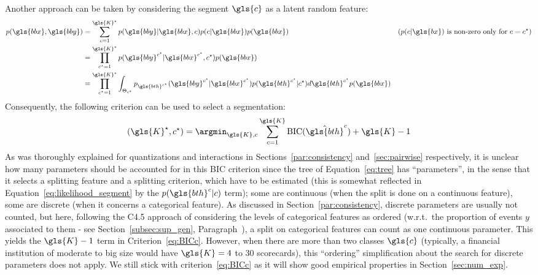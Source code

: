 Another approach can be taken by considering the segment $\gls{c}$ as a latent random feature:
\begin{align}
p(\gls{bbx},\gls{bby}) & =  \sum_{c=1}^{\gls{K}^\star} p(\gls{bby} | \gls{bbx}, c) p(c | \gls{bbx}) p(\gls{bbx}) & \text{($p(c | \gls{bx})$ is non-zero only for $c = c^\star$)} \nonumber \\
 & = \prod_{c^\star=1}^{\gls{K}^\star} p(\gls{bby}^{c^\star} | \gls{bbx}^{c^\star}, c^\star) p(\gls{bbx}) \nonumber \\
 & = \prod_{c^\star=1}^{\gls{K}^\star} \int_{\Theta_{c^\star}} p_{\gls{bth}^{c^\star}}(\gls{bby}^{c^\star} | \gls{bbx}^{c^\star}) p(\gls{bth}^{c^\star} | c^\star) d\gls{bth}^{c^\star} p(\gls{bbx}) \label{eq:likelihood_segment}
\end{align}
Consequently, the following criterion can be used to select a segmentation:
\begin{equation} \label{eq:BICc}
(\gls{K}^\star, c^\star) = \argmin_{\gls{K},c} \sum_{c=1}^{\gls{K}} \text{BIC}(\hat{\gls{bth}}^c) + \gls{K} - 1
\end{equation}
As was thoroughly explained for quantizations and interactions in Sections~\ref{par:consistency} and~\ref{sec:pairwise} respectively, it is unclear how many parameters should be accounted for in this BIC criterion since the tree of Equation~\eqref{eq:tree} has ``parameters'', in the sense that it selects a splitting feature and a splitting criterion, 
which have to be estimated (this is somewhat reflected in Equation~\eqref{eq:likelihood_segment} by the $p(\gls{bth}^c | c)$ term); some are continuous (when the split is done on a continuous feature), some are discrete (when it concerns a categorical feature). As discussed in Section~\ref{par:consistency}, discrete parameters are usually not counted, but here, following the C4.5 approach of considering the levels of categorical features as ordered (w.r.t.\ the proportion of events $y$ associated to them - see Section~\ref{subsec:sup_gen}, Paragraph~), a split on categorical features can count as one continuous parameter. This yields the $\gls{K}-1$ term in Criterion~\eqref{eq:BICc}. However, when there are more than two classes $\gls{c}$ (typically, a financial institution of moderate to big size would have $\gls{K} = 4$ to $30$ scorecards), this ``ordering'' simplification about the search for discrete parameters does not apply. We still stick with criterion~\eqref{eq:BICc} as it will show good empirical properties in Section~\ref{sec:num_exp}.



